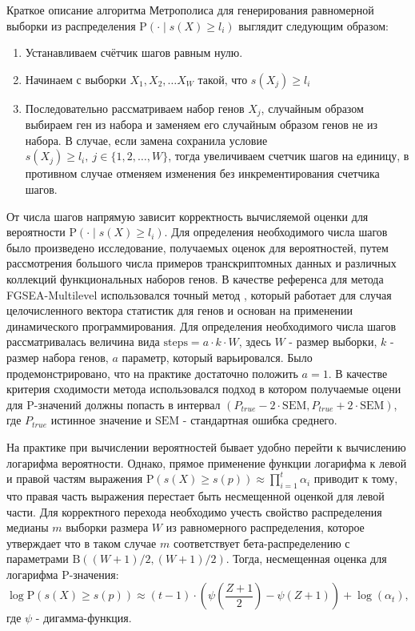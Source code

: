 Краткое описание алгоритма Метрополиса для генерирования равномерной выборки из распределения $\mathrm{P}\left(\cdot \mid s(X) \geqslant l_i \right)$ выглядит следующим образом:
\begin{enumerate}
    \item Устанавливаем счётчик шагов равным нулю.
    \item Начинаем с выборки $X_1, X_2, \ldots X_W$ такой, что $s(X_j) \geqslant l_i$
    \item Последовательно рассматриваем набор генов $X_j$, случайным образом выбираем ген из набора и заменяем его случайным образом генов не из набора. В случае, если замена сохранила условие $s(X_j) \geqslant l_i, \ j \in \{1, 2, \ldots, W \}$, тогда увеличиваем счетчик шагов на единицу, в противном случае отменяем изменения без инкрементирования счетчика шагов.
\end{enumerate}
От числа шагов напрямую зависит корректность вычисляемой оценки для вероятности $\mathrm{P}\left(\cdot \mid s(X) \geqslant l_i \right)$. 
Для определения необходимого числа шагов было произведено исследование, получаемых оценок для вероятностей, путем рассмотрения большого числа примеров транскриптомных данных и различных коллекций функциональных наборов генов.  
В качестве референса для метода FGSEA-Multilevel использовался точный метод \fixme{\cite{}}, который работает для случая целочисленного вектора статистик для генов и основан на применении динамического программирования.
Для определения необходимого числа шагов рассматривалась величина вида $\text{steps} = a \cdot k \cdot W$, здесь $W$ - размер выборки, $k$ - размер набора генов, $a$ параметр, который варьировался.
Было продемонстрировано, что на практике достаточно положить $a = 1$. В качестве критерия сходимости метода использовался подход в котором получаемые оцени для P-значений должны попасть в интервал $\left(P_{true} - 2 \cdot \mathrm{SEM}, P_{true} + 2 \cdot \mathrm{SEM} \right)$, где $P_{true}$ истинное значение и $\mathrm{SEM}$ - стандартная ошибка среднего.

На практике при вычислении вероятностей бывает удобно перейти к вычислению логарифма вероятности.
Однако, прямое применение функции логарифма к левой и правой частям выражения $\mathrm{P} \left(s(X) \geqslant s(p) \right) \approx \prod\limits_{i = 1}^{t} \alpha_i $ приводит к тому, что правая часть выражения перестает быть несмещенной оценкой для левой части.
Для корректного перехода необходимо учесть свойство распределения медианы $m$ выборки размера $W$ из равномерного распределения, которое утверждает что в таком случае $m$ соответствует бета-распределению с параметрами $\mathrm{B} \left((W + 1) / 2, (W + 1)/ 2 \right)$. Тогда, несмещенная оценка для логарифма P-значения:
\[
    \log \mathrm{P} \left(s(X) \geqslant s(p) \right) \approx (t - 1) \cdot \left( \psi \left( \frac{Z + 1}{2}\right) - \psi \left(Z + 1 \right)\right) + \log (\alpha_t),
\]
где $\psi$ - дигамма-функция.

